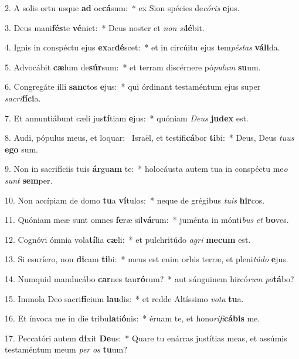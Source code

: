 2. A solis ortu usque \textbf{ad} oc\textbf{cá}sum:~*  ex Sion spécies de\textit{có}\textit{ris} \textbf{e}jus.\

3. Deus mani\textbf{fés}te \textbf{vé}niet:~*  Deus noster et \textit{non} \textit{si}\textbf{lé}bit.\

4. Ignis in conspéctu ejus \textbf{ex}ar\textbf{dé}scet:~*  et in circúitu ejus tem\textit{pés}\textit{tas} \textbf{vá}\textbf{li}da.\

5. Advocábit \textbf{cæ}lum de\textbf{súr}sum:~*  et terram discérnere pó\textit{pu}\textit{lum} \textbf{su}um.\

6. Congregáte illi \textbf{sanc}tos \textbf{e}jus:~*  qui órdinant testaméntum ejus super \textit{sa}\textit{cri}\textbf{fí}\textbf{ci}a.\

7. Et annuntiábunt cæli jus\textbf{tí}tiam \textbf{e}jus:~*  quóniam \textit{De}\textit{us} \textbf{ju}\textbf{dex} est.\

8. Audi, pópulus meus, et loquar: \dag\  Israël, et testifi\textbf{cá}bor \textbf{ti}bi:~*  Deus, Deus \textit{tu}\textit{us} \textbf{e}\textbf{go} sum.\

9. Non in sacrifíciis tuis \textbf{ár}gu\textbf{am} te:~*  holocáusta autem tua in conspéctu me\textit{o} \textit{sunt} \textbf{sem}per.\

10. Non accípiam de domo \textbf{tu}a \textbf{ví}tulos:~*  neque de grégibus \textit{tu}\textit{is} \textbf{hir}cos.\

11. Quóniam meæ sunt omnes \textbf{fe}ræ sil\textbf{vá}rum:~*  juménta in mónti\textit{bus} \textit{et} \textbf{bo}ves.\

12. Cognóvi ómnia vola\textbf{tí}lia \textbf{cæ}li:~*  et pulchritúdo \textit{a}\textit{gri} \textbf{me}\textbf{cum} est.\

13. Si esuríero, non \textbf{di}cam \textbf{ti}bi:~*  meus est enim orbis terræ, et pleni\textit{tú}\textit{do} \textbf{e}jus.\

14. Numquid manducábo \textbf{car}nes tau\textbf{ró}rum?~*  aut sánguinem hircó\textit{rum} \textit{po}\textbf{tá}bo?\

15. Immola Deo sacri\textbf{fí}cium \textbf{lau}dis:~*  et redde Altíssimo \textit{vo}\textit{ta} \textbf{tu}a.\

16. Et ínvoca me in die tribu\textbf{la}ti\textbf{ó}nis:~*  éruam te, et hono\textit{ri}\textit{fi}\textbf{cá}\textbf{bis} me.\

17. Peccatóri autem \textbf{di}xit \textbf{De}us:~*  Quare tu enárras justítias meas, et assúmis testaméntum meum \textit{per} \textit{os} \textbf{tu}um?\

